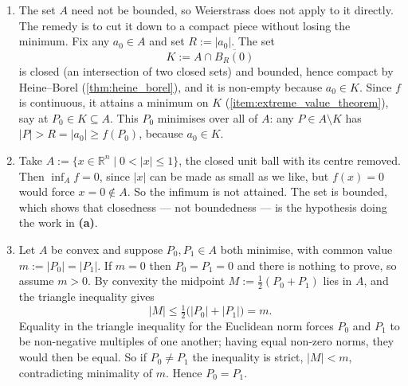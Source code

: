 \begin{exercisesolution}
\label{sol:nearest_point_to_origin}
\begin{enumerate}[label=\textbf{(\alph*)}]
  \item The set $A$ need not be bounded, so Weierstrass does not apply to it directly. The remedy is
    to cut it down to a compact piece without losing the minimum. Fix any $a_0 \in A$ and set
    $R := \lvert a_0\rvert$. The set
\[K := A \cap \overline{B_R(0)}\]
    is closed (an intersection of two closed sets) and bounded, hence compact by Heine--Borel
    (\cref{thm:heine_borel}), and it is non-empty because $a_0 \in K$. Since $f$ is continuous, it
    attains a minimum on $K$ (\cref{item:extreme_value_theorem}), say at $P_0 \in K \subseteq A$.
    This $P_0$ minimises over all of $A$: any $P \in A \setminus K$ has $\lvert P\rvert > R =
    \lvert a_0\rvert \ge f(P_0)$, because $a_0 \in K$.

  \item Take $A := \{x \in \mathbb{R}^n \mid 0 < \lvert x\rvert \le 1\}$, the closed unit ball with
    its centre removed. Then $\inf_A f = 0$, since $\lvert x\rvert$ can be made as small as we like,
    but $f(x) = 0$ would force $x = 0 \notin A$. So the infimum is not attained. The set is bounded,
    which shows that closedness --- not boundedness --- is the hypothesis doing the work in
    \textbf{(a)}.

  \item Let $A$ be convex and suppose $P_0, P_1 \in A$ both minimise, with common value
    $m := \lvert P_0\rvert = \lvert P_1\rvert$. If $m = 0$ then $P_0 = P_1 = 0$ and there is nothing
    to prove, so assume $m > 0$. By convexity the midpoint $M := \tfrac12(P_0+P_1)$ lies in $A$, and
    the triangle inequality gives
\[\lvert M\rvert \le \tfrac12\big(\lvert P_0\rvert + \lvert P_1\rvert\big) = m.\]
    Equality in the triangle inequality for the Euclidean norm forces $P_0$ and $P_1$ to be
    non-negative multiples of one another; having equal non-zero norms, they would then be equal.
    So if $P_0 \neq P_1$ the inequality is strict, $\lvert M\rvert < m$, contradicting minimality of
    $m$. Hence $P_0 = P_1$.


\end{enumerate}
\end{exercisesolution}
